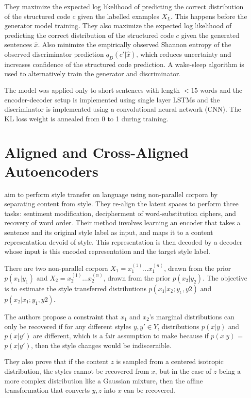 They maximize the expected log likelihood of predicting the correct distribution of the structured code $c$ given the labelled examples $X_L$. This happens before the generator model training. They also maximize the expected log likelihood of predicting the correct distribution of the structured code $c$ given the generated sentences $\hat{x}$. Also minimize the empirically observed Shannon entropy of the observed discriminator prediction $q_D(c'|\hat{x})$, which reduces uncertainty and increases confidence of the structured code prediction. A wake-sleep algorithm \citep{hinton1995wake} is used to alternatively train the generator and discriminator.

The model was applied only to short sentences with length $<15$ words and the encoder-decoder setup is implemented using single layer LSTMs and the discriminator is implemented using a convolutional neural network (CNN). The KL loss weight is annealed from 0 to 1 during training.


\section{Aligned and Cross-Aligned Autoencoders}

\cite{shen2017style} aim to perform style transfer on language using non-parallel corpora by separating content from style. They re-align the latent spaces to perform three tasks: sentiment modification, decipherment of word-substitution ciphers, and recovery of word order. Their method involves learning an encoder that takes a sentence and its original style label as input, and maps it to a content representation devoid of style. This representation is then decoded by a decoder whose input is this encoded representation and the target style label.

There are two non-parallel corpora $X_1 = {x_1^{(1)} ... x_1^{(n)}}$, drawn from the prior $p(x_1|y_1)$ and $X_2 = {x_2^{(1)} ... x_2^{(n)}}$, drawn from the prior $p(x_2|y_2)$. The objective is to estimate the style transferred distributions $p(x_1|x_2;y_1,y2)$ and $p(x_2|x_1;y_1,y2)$.

The authors propose a constraint that $x_1$ and $x_2$'s marginal distributions can only be recovered if for any different styles $y, y' \in Y$, distributions $p(x|y)$ and $p(x|y')$ are different, which is a fair assumption to make because if $p(x|y)$ = $p(x|y')$, then the style changes would be indiscernible.

They also prove that if the content $z$ is sampled from a centered isotropic distribution, the styles cannot be recovered from $x$, but in the case of $z$ being a more complex distribution like a Gaussian mixture, then the affine transformation that converts $y, z$ into $x$ can be recovered.

